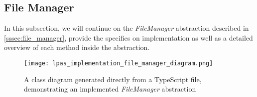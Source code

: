 
\subsection{File Manager}
\label{sssec:file_manager_implementation}

In this subsection, we will continue on the \textit{FileManager} abstraction described in \autoref{sssec:file_manager}, provide the specifics on implementation as well as a detailed overview of each method inside the abstraction.  

\begin{figure}[h]
\centering
\texttt{[image: lpas\_implementation\_file\_manager\_diagram.png]}
\caption{A class diagram generated directly from a TypeScript file, demonstrating an implemented \textit{FileManager} abstraction}
\label{fig:lpas_filemanager_implementation_class}
\end{figure}


